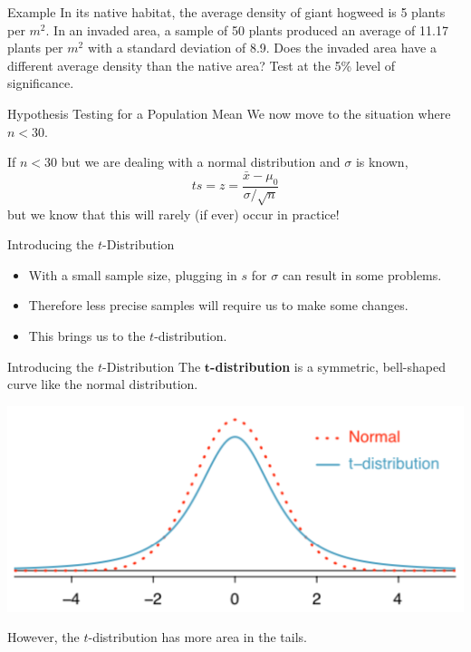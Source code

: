 \begin{frame}{Example}
    In its native habitat, the average density of giant hogweed is 5 plants per $m^2$. In an invaded area, a sample of 50 plants produced an average of 11.17 plants per $m^2$ with a standard deviation of 8.9. Does the invaded area have a different average density than the native area? Test at the 5\% level of significance. 
\end{frame}

\begin{frame}{Hypothesis Testing for a Population Mean}
    We now move to the situation where $n < 30$. 
    
    \vspace{12pt}If $n < 30$ but we are dealing with a normal distribution and $\sigma$ is known,
    \[
        ts = z = \frac{\bar{x} - \mu_0}{\sigma / \sqrt{n}}
    \]
    but we know that this will rarely (if ever) occur in practice!
\end{frame}

\begin{frame}{Introducing the $t$-Distribution} 
    \begin{itemize}
        \item With a small sample size, plugging in $s$ for $\sigma$ can result in some problems.
        \item Therefore less precise samples will require us to make some changes.
        \item This brings us to the $t$-distribution.
    \end{itemize}
\end{frame}

\begin{frame}{Introducing the $t$-Distribution}
    The \textbf{$\boldsymbol{t}$-distribution} is a symmetric, bell-shaped curve like the normal distribution. 
    \begin{center}
        \includegraphics[scale=0.5]{images/tvsnrml.png}
    \end{center}
    
    However, the $t$-distribution has more area in the tails.
\end{frame}


